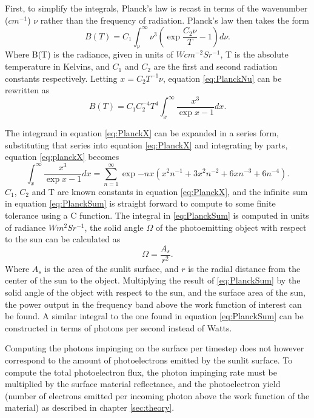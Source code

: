 First, to simplify the integrals, Planck's law is recast in terms of the wavenumber ($cm^{-1}$) $\nu$ rather than the frequency of radiation. Planck's law then takes the form
\begin{equation}\label{eq:PlanckNu}
    B(T) = C_1 \int^{\infty}_{\nu} \nu^3 \left(\exp{\frac{C_2 \nu}{T}} - 1 \right) d \nu.
\end{equation}
Where B(T) is the radiance, given in units of $W cm^{-2} Sr^{-1}$, T is the absolute temperature in Kelvins, and $C_1$ and $C_2$ are the first and second radiation constants respectively. Letting $x = C_2 T^{-1} \nu$, equation \eqref{eq:PlanckNu} can be rewritten as 
\begin{equation}\label{eq:PlanckX}
    B(T) = C_1 C_2^{-4} T^4 \int^{\infty}_x \frac{x^3}{\exp{x} - 1} dx.
\end{equation}

The integrand in equation \eqref{eq:PlanckX} can be expanded in a series form, substituting that series into equation \eqref{eq:PlanckX} and integrating by parts, equation \eqref{eq:planckX} becomes
\begin{equation}\label{eq:PlanckSum}
    \int^{\infty}_x \frac{x^3}{\exp{x} - 1} dx = \sum^{\infty}_{n=1} \exp{-n x} \left(x^2 n^{-1} + 3 x^2 n^{-2} + 6 x n^{-3} + 6 n^{-4} \right).
\end{equation}
$C_1$, $C_2$ and T are known constants in equation \eqref{eq:PlanckX}, and the infinite sum in equation \eqref{eq:PlanckSum} is straight forward to compute to some finite tolerance using a C function. The integral in \eqref{eq:PlanckSum} is computed in units of radiance $W m^2 Sr^{-1}$, the solid angle $\Omega$ of the photoemitting object with respect to the sun can be calculated as
\begin{equation*}
    \Omega = \frac{A_s}{r^2}.
\end{equation*}
Where $A_s$ is the area of the sunlit surface, and $r$ is the radial distance from the center of the sun to the object. Multiplying the result of \eqref{eq:PlanckSum} by the solid angle of the object with respect to the sun, and the surface area of the sun, the power output in the frequency band above the work function of interest can be found. A similar integral to the one found in equation \eqref{eq:PlanckSum} can be constructed in terms of photons per second instead of Watts.

Computing the photons impinging on the surface per timestep does not however correspond to the amount of photoelectrons emitted by the sunlit surface. To compute the total photoelectron flux, the photon impinging rate must be multiplied by the surface material reflectance, and the photoelectron yield (number of electrons emitted per incoming photon above the work function of the material) as described in chapter \ref{sec:theory}.

